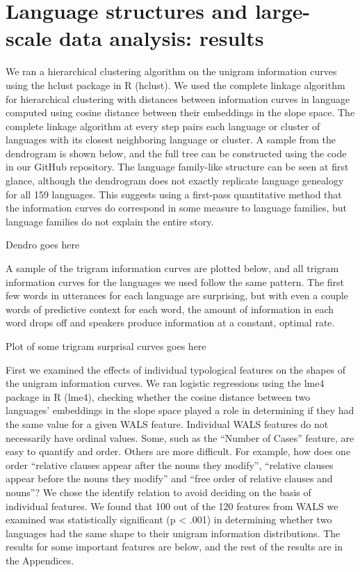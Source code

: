 \documentclass[11pt,]{article}
\begin{document}
\hypertarget{language-structures-and-large-scale-data-analysis-results}{%
\section{Language structures and large-scale data analysis: results}\label{language-structures-and-large-scale-data-analysis-results}}

We ran a hierarchical clustering algorithm on the unigram information curves using the hclust package in R (hclust). We used the complete linkage algorithm for hierarchical clustering with distances between information curves in language computed using cosine distance between their embeddings in the slope space. The complete linkage algorithm at every step pairs each language or cluster of languages with its closest neighboring language or cluster. A sample from the dendrogram is shown below, and the full tree can be constructed using the code in our GitHub repository. The language family-like structure can be seen at first glance, although the dendrogram does not exactly replicate language genealogy for all 159 languages. This suggests using a first-pass quantitative method that the information curves do correspond in some measure to language families, but language families do not explain the entire story.

Dendro goes here

A sample of the trigram information curves are plotted below, and all trigram information curves for the languages we used follow the same pattern. The first few words in utterances for each language are surprising, but with even a couple words of predictive context for each word, the amount of information in each word drops off and speakers produce information at a constant, optimal rate.

Plot of some trigram surprisal curves goes here

First we examined the effects of individual typological features on the shapes of the unigram information curves. We ran logistic regressions using the lme4 package in R (lme4), checking whether the cosine distance between two languages' embeddings in the slope space played a role in determining if they had the same value for a given WALS feature. Individual WALS features do not necessarily have ordinal values. Some, such as the ``Number of Cases'' feature, are easy to quantify and order. Others are more difficult. For example, how does one order ``relative clauses appear after the nouns they modify'', ``relative clauses appear before the nouns they modify'' and ``free order of relative clauses and nouns''? We chose the identify relation to avoid deciding on the basis of individual features. We found that 100 out of the 120 features from WALS we examined was statistically significant (p \textless{} .001) in determining whether two languages had the same shape to their unigram information distributions. The results for some important features are below, and the rest of the results are in the Appendices.
\end{document}
